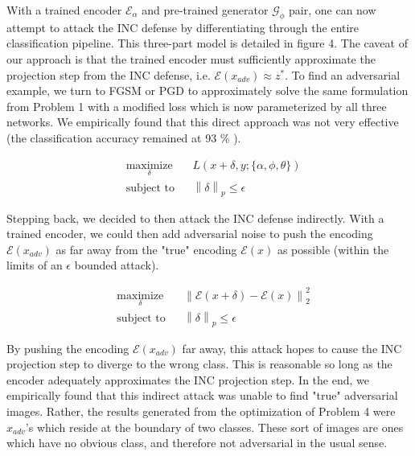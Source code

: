 \documentclass[twoside]{article}
\theoremstyle{definition}
\newcommand{\norm}[2]{\left\lVert #1 \right\rVert_{#2}}
\begin{document}
With a trained encoder $\mathcal{E}_{\alpha}$ and pre-trained generator $\mathcal{G}_{\phi}$ pair, one can now attempt to attack the INC defense by differentiating through the entire classification pipeline. This three-part model is detailed in figure 4. The caveat of our approach is that the trained encoder must sufficiently approximate the projection step from the INC defense, i.e. $\mathcal{E}(x_{adv}) \approx z^*$. To find an adversarial example, we turn to FGSM or PGD to approximately solve the same formulation from Problem 1 with a modified loss which is now parameterized by all three networks. We empirically found that this direct approach was not very effective (the classification accuracy remained at 93 \% ). 

\begin{problem}
    \begin{equation*}
    \begin{aligned}
    & \underset{\delta}{\text{maximize}}
    & & L(x+\delta,y;\{\alpha,\phi,\theta\}) \\
    & \text{subject to}
    & & \norm{\delta}{p} \leq \epsilon
    \end{aligned}
    \end{equation*}
\end{problem}

Stepping back, we decided to then attack the INC defense indirectly. With a trained encoder, we could then add adversarial noise to push the encoding $\mathcal{E}(x_{adv})$ as far away from the "true" encoding $\mathcal{E}(x)$ as possible (within the limits of an $\epsilon$ bounded attack).

\begin{problem}
\begin{equation*}
\begin{aligned}
& \underset{\delta}{\text{maximize}}
& & \norm{\mathcal{E}(x+\delta)-\mathcal{E}(x)}{2}^2 \\
& \text{subject to}
& & \norm{\delta}{p} \leq \epsilon
\end{aligned}
\end{equation*}
\end{problem}

By pushing the encoding $\mathcal{E}(x_{adv})$ far away, this attack hopes to cause the INC projection step to diverge to the wrong class. This is reasonable so long as the encoder adequately approximates the INC projection step. In the end, we empirically found that this indirect attack was unable to find "true" adversarial images. Rather, the results generated from the optimization of Problem 4 were $x_{adv}$'s which reside at the boundary of two classes. These sort of images are ones which have no obvious class, and therefore not adversarial in the usual sense. 
\end{document}
